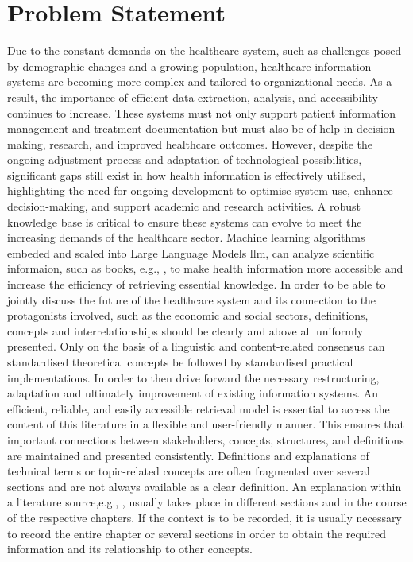 \section{Problem Statement}
Due to the constant demands on the healthcare system, such as challenges posed by demographic changes and a growing population, healthcare information systems are becoming more complex and tailored to organizational needs. 
As a result, the importance of efficient data extraction, analysis, and accessibility continues to increase. 
These systems must not only support patient information management and treatment documentation but must also be of help in decision-making, research, and improved healthcare outcomes. 
However, despite the ongoing adjustment process and adaptation of technological possibilities, significant gaps still exist in how health information is effectively utilised, highlighting the need for ongoing development to optimise system use, enhance decision-making, and support academic and research activities. 
A robust knowledge base is critical to ensure these systems can evolve to meet the increasing demands of the healthcare sector.
Machine learning algorithms embeded and scaled into Large Language Models \ac{llm}, can analyze scientific informaion, such as books, e.g., \citet{bb2}, to make health information more accessible and increase the efficiency of retrieving essential knowledge. 
In order to be able to jointly discuss the future of the healthcare system and its connection to the protagonists involved, such as the economic and social sectors, definitions, concepts and interrelationships should be clearly and above all uniformly presented. 
Only on the basis of a linguistic and content-related consensus can standardised theoretical concepts be followed by standardised practical implementations. 
In order to then drive forward the necessary restructuring, adaptation and ultimately improvement of existing information systems. 
An efficient, reliable, and easily accessible retrieval model is essential to access the content of this literature in a flexible and user-friendly manner. 
This ensures that important connections between stakeholders, concepts, structures, and definitions are maintained and presented consistently. 
Definitions and explanations of technical terms or topic-related concepts are often fragmented over several sections and are not always available as a clear definition. 
An explanation within a literature source,e.g., \citet{bb2}, usually takes place in different sections and in the course of the respective chapters.
If the context is to be recorded, it is usually necessary to record the entire chapter or several sections in order to obtain the required information and its relationship to other concepts. 
